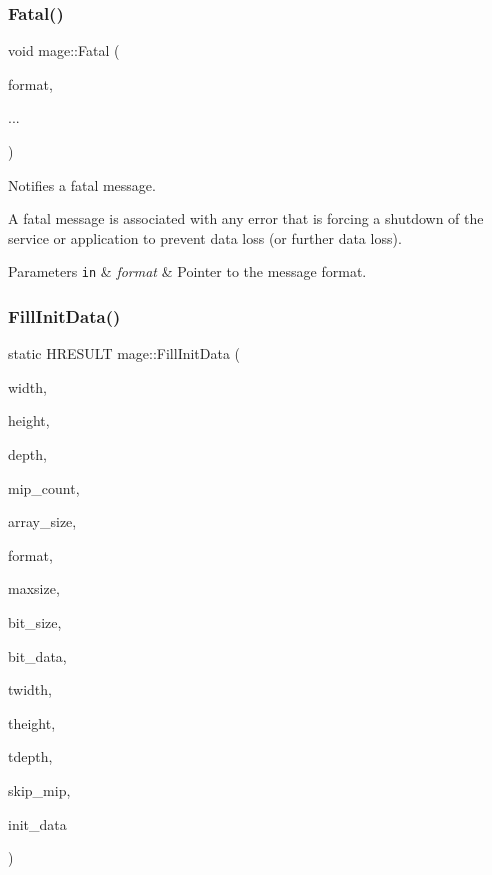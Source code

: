 \subsubsection{\texorpdfstring{Fatal()}{Fatal()}}
{\footnotesize\ttfamily void mage\+::\+Fatal (\begin{DoxyParamCaption}\item[{const char $\ast$}]{format,  }\item[{}]{... }\end{DoxyParamCaption})}

Notifies a fatal message.

A fatal message is associated with any error that is forcing a shutdown of the service or application to prevent data loss (or further data loss).


\begin{DoxyParams}[1]{Parameters}
\mbox{\tt in}  & {\em format} & Pointer to the message format. \\
\hline
\end{DoxyParams}
\hypertarget{namespacemage_ac20162a68be6828c38072a3afb0711c1}{}\label{namespacemage_ac20162a68be6828c38072a3afb0711c1} 
\subsubsection{\texorpdfstring{Fill\+Init\+Data()}{FillInitData()}}
{\footnotesize\ttfamily static H\+R\+E\+S\+U\+LT mage\+::\+Fill\+Init\+Data (\begin{DoxyParamCaption}\item[{\+\_\+\+In\+\_\+ size\+\_\+t}]{width,  }\item[{\+\_\+\+In\+\_\+ size\+\_\+t}]{height,  }\item[{\+\_\+\+In\+\_\+ size\+\_\+t}]{depth,  }\item[{\+\_\+\+In\+\_\+ size\+\_\+t}]{mip\+\_\+count,  }\item[{\+\_\+\+In\+\_\+ size\+\_\+t}]{array\+\_\+size,  }\item[{\+\_\+\+In\+\_\+ D\+X\+G\+I\+\_\+\+F\+O\+R\+M\+AT}]{format,  }\item[{\+\_\+\+In\+\_\+ size\+\_\+t}]{maxsize,  }\item[{\+\_\+\+In\+\_\+ size\+\_\+t}]{bit\+\_\+size,  }\item[{\+\_\+\+In\+\_\+reads\+\_\+bytes\+\_\+(bit\+\_\+size) const uint8\+\_\+t $\ast$}]{bit\+\_\+data,  }\item[{\+\_\+\+Out\+\_\+ size\+\_\+t \&}]{twidth,  }\item[{\+\_\+\+Out\+\_\+ size\+\_\+t \&}]{theight,  }\item[{\+\_\+\+Out\+\_\+ size\+\_\+t \&}]{tdepth,  }\item[{\+\_\+\+Out\+\_\+ size\+\_\+t \&}]{skip\+\_\+mip,  }\item[{\+\_\+\+Out\+\_\+writes\+\_\+(mip\+\_\+count $\ast$array\+\_\+size) D3\+D11\+\_\+\+S\+U\+B\+R\+E\+S\+O\+U\+R\+C\+E\+\_\+\+D\+A\+TA $\ast$}]{init\+\_\+data }\end{DoxyParamCaption})\hspace{0.3cm}{\ttfamily [static]}}

